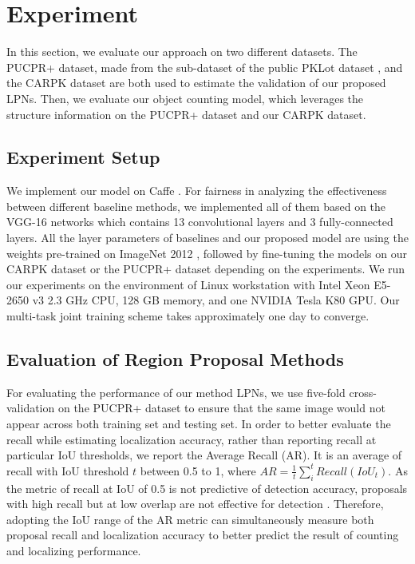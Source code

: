 \documentclass[10pt,twocolumn,letterpaper]{article}
\begin{document}
\section{Experiment}
In this section, we evaluate our approach on two different datasets. The PUCPR+ dataset, made from the sub-dataset of the public PKLot dataset \cite{01_de2015pklot}, and the CARPK dataset are both used to estimate the validation of our proposed LPNs. Then, we evaluate our object counting model, which leverages the structure information on the PUCPR+ dataset and our CARPK dataset.

\subsection{Experiment Setup}
We implement our model on Caffe \cite{40_jia2014caffe}. For fairness in analyzing the effectiveness between different baseline methods, we implemented all of them based on the VGG-16 networks \cite{06_simonyan2014very} which contains 13 convolutional layers and 3 fully-connected layers. All the layer parameters of baselines and our proposed model are using the weights pre-trained on ImageNet 2012 \cite{41_russakovsky2015imagenet}, followed by fine-tuning the models on our CARPK dataset or the PUCPR+ dataset depending on the experiments. We run our experiments on the environment of Linux workstation with Intel Xeon E5-2650 v3 2.3 GHz CPU, 128 GB memory, and one NVIDIA Tesla K80 GPU. Our multi-task joint training scheme takes approximately one day to converge.

\subsection{Evaluation of Region Proposal Methods}

For evaluating the performance of our method LPNs, we use five-fold cross-validation on the PUCPR+ dataset to ensure that the same image would not appear across both training set and testing set. In order to better evaluate the recall while estimating localization accuracy, rather than reporting recall at particular IoU thresholds, we report the Average Recall (AR). It is an average of recall with IoU threshold $t$ between 0.5 to 1, where $AR = \frac{1}{t} \sum_{i}^{t} Recall(IoU_{t})$. As the metric of recall at IoU of 0.5 is not predictive of detection accuracy, proposals with high recall but at low overlap are not effective for detection \cite{42_hosang2016makes}. Therefore, adopting the IoU range of the AR metric can simultaneously measure both proposal recall and localization accuracy to better predict the result of counting and localizing performance.
\end{document}
